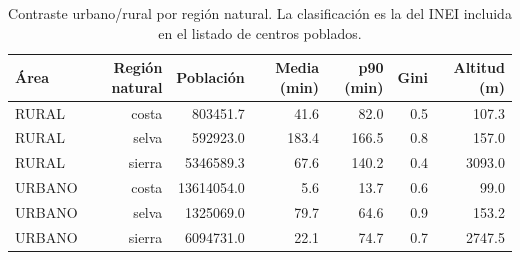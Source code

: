 \begin{table}[htbp]
\caption{Contraste urbano/rural por región natural. La clasificación es la del INEI incluida en el listado de centros poblados.}
\label{tab:urbano-rural}
\footnotesize
\begin{tabular}{lrrrrrr}
\toprule
Área & Región natural & Población & Media (min) & p90 (min) & Gini & Altitud (m) \\
\midrule
RURAL & costa & 803451.7 & 41.6 & 82.0 & 0.5 & 107.3 \\
RURAL & selva & 592923.0 & 183.4 & 166.5 & 0.8 & 157.0 \\
RURAL & sierra & 5346589.3 & 67.6 & 140.2 & 0.4 & 3093.0 \\
URBANO & costa & 13614054.0 & 5.6 & 13.7 & 0.6 & 99.0 \\
URBANO & selva & 1325069.0 & 79.7 & 64.6 & 0.9 & 153.2 \\
URBANO & sierra & 6094731.0 & 22.1 & 74.7 & 0.7 & 2747.5 \\
\bottomrule
\end{tabular}
\end{table}
